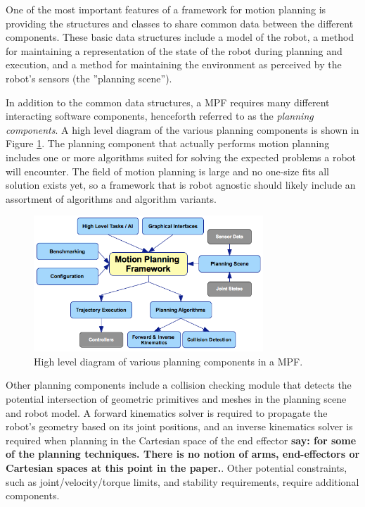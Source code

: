 \documentclass[10pt,journal,compsoc]{joser1}
\begin{document}
{One of the most important features of a framework for motion planning is providing the structures and classes to share common data between the different components. These basic data structures include a model of the robot, a method for maintaining a representation of the state of the robot during planning and execution, and a method for maintaining the environment as perceived by the robot's sensors (the ''planning scene'').

In addition to the common data structures, a MPF requires many different interacting software components, henceforth referred to as the \textit{planning components}. A high level diagram of the various planning components is shown in Figure \ref{fig:motionplanning_highlevel}. The planning component that actually performs motion planning includes one or more algorithms suited for solving the expected problems a robot will encounter. The field of motion planning is large and no one-size fits all solution exists yet, so a framework that is robot agnostic should likely include an assortment of algorithms and algorithm variants.

\begin{figure}[!t]
\centering
\includegraphics[width=3.4in]{images/motionplanning_highlevel}
\caption{High level diagram of various planning components in a MPF.}
\label{fig:motionplanning_highlevel}
\end{figure} 

Other planning components include a collision checking module that detects the potential intersection of geometric primitives and meshes in the planning scene and robot model. A forward kinematics solver is required to propagate the robot's geometry based on its joint positions, and an inverse kinematics solver is required when planning in the Cartesian space of the end effector \textbf{say: for some of the planning techniques. There is no notion of arms, end-effectors or Cartesian spaces at this point in the paper.}. Other potential constraints, such as joint/velocity/torque limits, and stability requirements, require additional components.

}
\end{document}
